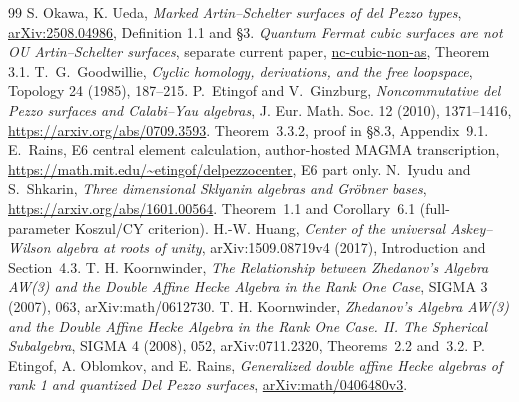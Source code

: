 \documentclass[11pt,a4paper]{ltjsarticle}
\theoremstyle{definition}\newtheorem{definition}[theorem]{定義}
\begin{document}
\begin{thebibliography}{99}
 S. Okawa, K. Ueda,
\emph{Marked Artin--Schelter surfaces of del Pezzo types},
\href{https://arxiv.org/abs/2508.04986}{arXiv:2508.04986}, Definition 1.1 and \S3.
 \emph{Quantum Fermat cubic surfaces are not OU Artin--Schelter surfaces},
separate current paper, \href{https://github.com/uedakazushi/nc-cubic-non-as/blob/main/papers/quantum_fermat_not_as_surface.tex}{nc-cubic-non-as}, Theorem 3.1.
 T.~G.~Goodwillie,
\emph{Cyclic homology, derivations, and the free loopspace},
Topology 24 (1985), 187--215.
 P.~Etingof and V.~Ginzburg,
\emph{Noncommutative del Pezzo surfaces and Calabi--Yau algebras},
J. Eur. Math. Soc. 12 (2010), 1371--1416,
\url{https://arxiv.org/abs/0709.3593}.
Theorem~3.3.2, proof in \S8.3, Appendix~9.1.
 E.~Rains, E6 central element calculation,
author-hosted MAGMA transcription,
\url{https://math.mit.edu/~etingof/delpezzocenter}, E6 part only.
 N.~Iyudu and S.~Shkarin,
\emph{Three dimensional Sklyanin algebras and Gr\"obner bases},
\url{https://arxiv.org/abs/1601.00564}.
Theorem~1.1 and Corollary~6.1 (full-parameter Koszul/CY criterion).
H.-W. Huang, \emph{Center of the universal Askey--Wilson algebra at roots of unity},
arXiv:1509.08719v4 (2017), Introduction and Section~4.3.
T. H. Koornwinder, \emph{The Relationship between Zhedanov's Algebra AW(3)
and the Double Affine Hecke Algebra in the Rank One Case},
SIGMA 3 (2007), 063, arXiv:math/0612730.
T. H. Koornwinder, \emph{Zhedanov's Algebra AW(3) and the Double Affine Hecke
Algebra in the Rank One Case. II. The Spherical Subalgebra},
SIGMA 4 (2008), 052, arXiv:0711.2320, Theorems~2.2 and~3.2.
P. Etingof, A. Oblomkov, and E. Rains,
\emph{Generalized double affine Hecke algebras of rank 1 and quantized Del Pezzo surfaces},
\href{https://arxiv.org/abs/math/0406480}{arXiv:math/0406480v3}.


\end{thebibliography}
\end{document}
